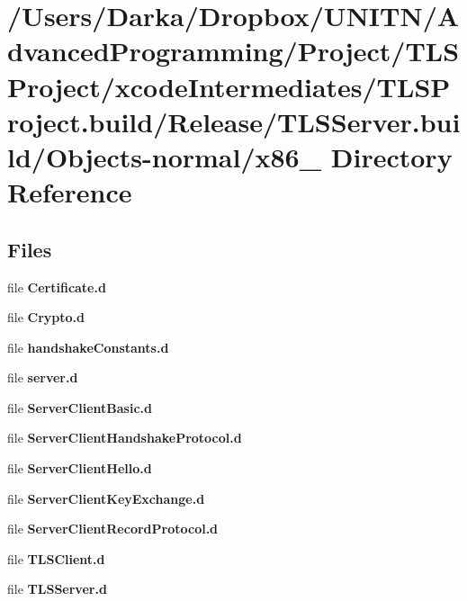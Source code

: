 \section{/\+Users/\+Darka/\+Dropbox/\+U\+N\+I\+T\+N/\+Advanced\+Programming/\+Project/\+T\+L\+S\+Project/xcode\+Intermediates/\+T\+L\+S\+Project.build/\+Release/\+T\+L\+S\+Server.build/\+Objects-\/normal/x86\+\_ Directory Reference}
\label{dir_2ebd084926758a8037f6f6ace18991ec}
\subsection*{Files}
\begin{DoxyCompactItemize}
\item 
file {\bf Certificate.\+d}
\item 
file {\bf Crypto.\+d}
\item 
file {\bf handshake\+Constants.\+d}
\item 
file {\bf server.\+d}
\item 
file {\bf Server\+Client\+Basic.\+d}
\item 
file {\bf Server\+Client\+Handshake\+Protocol.\+d}
\item 
file {\bf Server\+Client\+Hello.\+d}
\item 
file {\bf Server\+Client\+Key\+Exchange.\+d}
\item 
file {\bf Server\+Client\+Record\+Protocol.\+d}
\item 
file {\bf T\+L\+S\+Client.\+d}
\item 
file {\bf T\+L\+S\+Server.\+d}
\end{DoxyCompactItemize}
